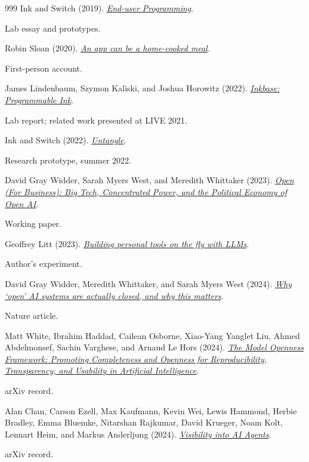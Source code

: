 \documentclass[11pt,letterpaper]{article}
\begin{document}
\begin{thebibliography}{999}
Ink and Switch (2019).
\href{https://www.inkandswitch.com/end-user-programming/}{\emph{End-user Programming}}.
\par {\small Lab essay and prototypes.}

Robin Sloan (2020).
\href{https://www.robinsloan.com/notes/home-cooked-app/}{\emph{An app can be a home-cooked meal}}.
\par {\small First-person account.}

James Lindenbaum, Szymon Kaliski, and Joshua Horowitz (2022).
\href{https://www.inkandswitch.com/inkbase/}{\emph{Inkbase: Programmable Ink}}.
\par {\small Lab report; related work presented at LIVE 2021.}

Ink and Switch (2022).
\href{https://www.inkandswitch.com/project/untangle/}{\emph{Untangle}}.
\par {\small Research prototype, summer 2022.}

David Gray Widder, Sarah Myers West, and Meredith Whittaker (2023).
\href{https://papers.ssrn.com/sol3/papers.cfm?abstract_id=4543807}{\emph{Open (For Business): Big Tech, Concentrated Power, and the Political Economy of Open AI}}.
\par {\small Working paper.}

Geoffrey Litt (2023).
\href{https://www.geoffreylitt.com/2023/07/25/building-personal-tools-on-the-fly-with-llms}{\emph{Building personal tools on the fly with LLMs}}.
\par {\small Author’s experiment.}

David Gray Widder, Meredith Whittaker, and Sarah Myers West (2024).
\href{https://doi.org/10.1038/s41586-024-08141-1}{\emph{Why ‘open’ AI systems are actually closed, and why this matters}}.
\par {\small Nature article.}

Matt White, Ibrahim Haddad, Cailean Osborne, Xiao-Yang Yanglet Liu, Ahmed Abdelmonsef, Sachin Varghese, and Arnaud Le Hors (2024).
\href{https://arxiv.org/abs/2403.13784}{\emph{The Model Openness Framework: Promoting Completeness and Openness for Reproducibility, Transparency, and Usability in Artificial Intelligence}}.
\par {\small arXiv record.}

Alan Chan, Carson Ezell, Max Kaufmann, Kevin Wei, Lewis Hammond, Herbie Bradley, Emma Bluemke, Nitarshan Rajkumar, David Krueger, Noam Kolt, Lennart Heim, and Markus Anderljung (2024).
\href{https://arxiv.org/abs/2401.13138}{\emph{Visibility into AI Agents}}.
\par {\small arXiv record.}


\end{thebibliography}
\end{document}

